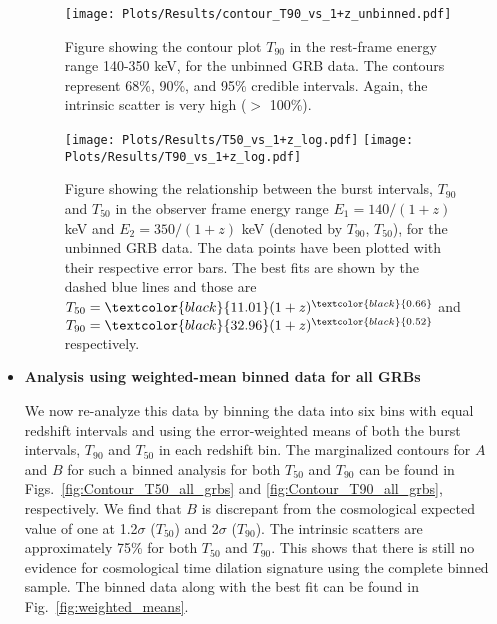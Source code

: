 \documentclass[prd,nofootinbib,preprintnumbers,floatfix]{revtex4}  %
\newcommand{\rthis}[1]{\textcolor{black}{#1}}
\begin{document}
\begin{itemize}
\begin{figure}
    \centering

    \texttt{[image: Plots/Results/contour\_T90\_vs\_1+z\_unbinned.pdf]}
   
    
    \caption{Figure showing the contour plot  $T_{90}$ in the rest-frame energy range 140-350 keV, for the unbinned GRB data. The contours represent 68\%, 90\%,  and 95\% credible intervals. Again, the intrinsic scatter is very high ($>$ 100\%).} 
    \label{fig:corner_T90_unbinned_data}
\end{figure}

\begin{figure}
    \centering

    \texttt{[image: Plots/Results/T50\_vs\_1+z\_log.pdf]}
    \texttt{[image: Plots/Results/T90\_vs\_1+z\_log.pdf]}
   
    
    \caption{Figure showing the relationship between the burst intervals, $T_{90}$ and $T_{50}$  in the observer frame  energy range $E_{1}=140/(1+z)$ keV and $E_{2}=350/(1+z) $ keV (denoted by $T_{90}$, $T_{50}$), for the unbinned GRB data. The data points have been plotted with their respective error bars. The best fits are shown by the dashed blue lines and those are $T_{50}=\rthis{11.01}(1+z)^{\rthis{0.66}}$ and $T_{90}=\rthis{32.96}(1+z)^{\rthis{0.52}}$ respectively. } %
    \label{fig:burst_intervals_with_redshifts}
\end{figure}


\item  {\bf Analysis using weighted-mean binned data for all GRBs}

We now re-analyze this data  by binning the data into six bins with equal redshift intervals and using  the error-weighted means of both the burst intervals, $T_{90}$ and $T_{50}$ in each redshift bin.
The marginalized contours for $A$ and $B$ for such a   binned analysis for both $T_{50}$ and $T_{90}$ can be found  in Figs.~\ref{fig:Contour_T50_all_grbs} and \ref{fig:Contour_T90_all_grbs}, respectively. We find that $B$ is discrepant from the cosmological expected value of one at 1.2$\sigma$ ($T_{50}$)  and 2$\sigma$ ($T_{90}$).   The intrinsic scatters are approximately 75\% for both $T_{50}$ and $T_{90}$. This shows that there is still no evidence for   cosmological time dilation signature using the complete binned sample.
The binned data along with the best fit can be found in Fig.~\ref{fig:weighted_means}.


\end{itemize}
\end{document}
